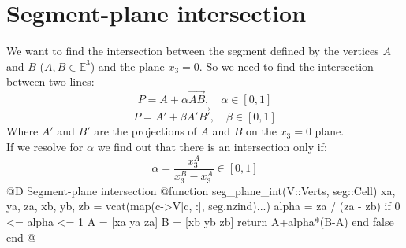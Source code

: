 \documentclass[10pt,oneside]{article}
\begin{document}
\section{Segment-plane intersection}
We want to find the intersection between the segment defined by the vertices $A$ and $B$ ($A, B \in \mathbb{E}^3$) and the plane $x_3=0$.
So we need to find the intersection between two lines:
\[ P=A+\alpha\overrightarrow{AB}, \quad \alpha \in [0,1] \]
\[ P=A'+\beta\overrightarrow{A'B'}, \quad \beta \in [0,1] \]
Where $A'$ and $B'$ are the projections of $A$ and $B$ on the $x_3=0$ plane. \\
If we resolve for $\alpha$ we find out that there is an intersection only if:
\[ \alpha = \frac{x^A_3}{x^B_3 - x^A_3} \in [0,1]\]
@D Segment-plane intersection
@{function seg_plane_int(V::Verts, seg::Cell)
    xa, ya, za, xb, yb, zb = vcat(map(c->V[c, :], seg.nzind)...)
    alpha = za / (za - zb)
    if 0 <= alpha <= 1
        A = [xa ya za]
        B = [xb yb zb]
        return A+alpha*(B-A)
    end
    false
end
@}


\end{document}
